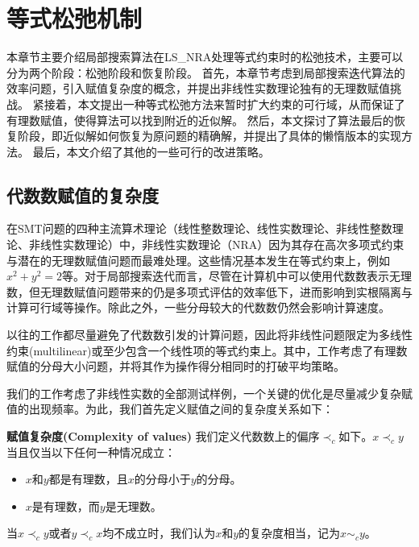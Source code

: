 \chapter{等式松弛机制}\label{chap:method2}

本章节主要介绍局部搜索算法在LS\_NRA处理等式约束时的松弛技术，主要可以分为两个阶段：松弛阶段和恢复阶段。
首先，本章节考虑到局部搜索迭代算法的效率问题，引入赋值复杂度的概念，并提出非线性实数理论独有的无理数赋值挑战。
紧接着，本文提出一种等式松弛方法来暂时扩大约束的可行域，从而保证了有理数赋值，使得算法可以找到附近的近似解。
然后，本文探讨了算法最后的恢复阶段，即近似解如何恢复为原问题的精确解，并提出了具体的懒惰版本的实现方法。
最后，本文介绍了其他的一些可行的改进策略。

\section{代数数赋值的复杂度}
在SMT问题的四种主流算术理论（线性整数理论、线性实数理论、非线性整数理论、非线性实数理论）中，非线性实数理论（NRA）因为其存在高次多项式约束与潜在的无理数赋值问题而最难处理。这些情况基本发生在等式约束上，例如$x^2 + y^2 = 2$等。对于局部搜索迭代而言，尽管在计算机中可以使用代数数表示无理数，但无理数赋值问题带来的仍是多项式评估的效率低下，进而影响到实根隔离与计算可行域等操作。除此之外，一些分母较大的代数数仍然会影响计算速度。

以往的工作\cite{multilinear,LiXZ23}都尽量避免了代数数引发的计算问题，因此将非线性问题限定为多线性约束(multilinear)或至少包含一个线性项的等式约束上。其中，工作\cite{multilinear}考虑了有理数赋值的分母大小问题，并将其作为操作得分相同时的打破平均策略。

我们的工作考虑了非线性实数的全部测试样例，一个关键的优化是尽量减少复杂赋值的出现频率。为此，我们首先定义赋值之间的复杂度关系如下：

\begin{definition}{\textbf{赋值复杂度(Complexity of values)}}
\label{def:complexity}
我们定义代数数上的偏序$\prec_c$如下。$x \prec_c y$当且仅当以下任何一种情况成立：

\begin{itemize}
    \item $x$和$y$都是有理数，且$x$的分母小于$y$的分母。
    \item $x$是有理数，而$y$是无理数。
\end{itemize}
当$x \prec_c y$或者$y \prec_c x$均不成立时，我们认为$x$和$y$的复杂度相当，记为$x \sim_c y$。
\end{definition}

